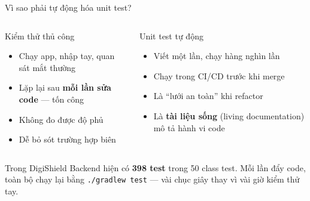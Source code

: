 \documentclass[aspectratio=169,12pt]{beamer}
\begin{document}
\begin{frame}[shrink=8]{Vì sao phải tự động hóa unit test?}
  \begin{columns}
    \begin{block}{Kiểm thử thủ công}
      \begin{itemize}
        \item Chạy app, nhập tay, quan sát mắt thường
        \item Lặp lại sau \textbf{mỗi lần sửa code} --- tốn công
        \item Không đo được độ phủ
        \item Dễ bỏ sót trường hợp biên
      \end{itemize}
    \end{block}

    \begin{block}{Unit test tự động}
      \begin{itemize}
        \item Viết một lần, chạy hàng nghìn lần
        \item Chạy trong CI/CD trước khi merge
        \item Là ``lưới an toàn'' khi refactor
        \item Là \textbf{tài liệu sống} (living documentation) mô tả hành vi code
      \end{itemize}
    \end{block}
  \end{columns}

  \vspace{0.4em}
  \begin{exampleblock}{Trong DigiShield}
    Backend hiện có \textbf{398 test} trong 50 class test.
    Mỗi lần đẩy code, toàn bộ chạy lại bằng \texttt{./gradlew test} ---
    vài chục giây thay vì vài giờ kiểm thử tay.
  \end{exampleblock}
\end{frame}
\end{document}
